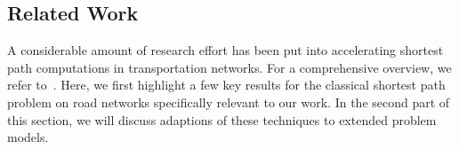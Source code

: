 \documentclass[manuscript,review]{acmart}
\begin{document}

\subsection{Related Work}\label{sec:related_work}

A considerable amount of research effort has been put into accelerating shortest path computations in transportation networks.
For a comprehensive overview, we refer to~\cite{bdgmpsww-rptn-16}.
Here, we first highlight a few key results for the classical shortest path problem on road networks specifically relevant to our work.
In the second part of this section, we will discuss adaptions of these techniques to extended problem models.
\end{document}

